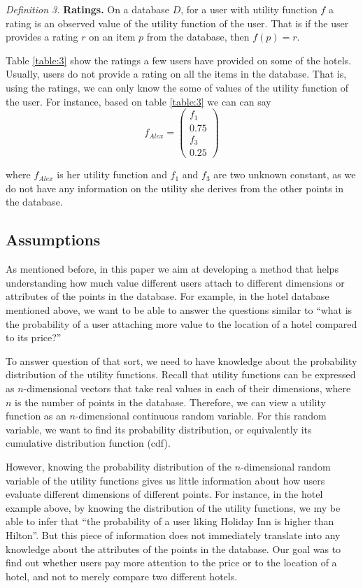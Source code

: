\medskip
\indent \textit{Definition 3.}  \textbf{Ratings.} On a database $D$, for a user with utility function $f$ a rating is an observed value of the utility function of the user. That is if the user provides a rating $r$ on an item $p$ from the database, then $f(p) = r$.
\medskip

Table \ref{table:3} show the ratings a few users have provided on some of the hotels. Usually, users do not provide a rating on all the items in the database. That is, using the ratings, we can only know the some of values of the utility function of the user. For instance, based on table \ref{table:3} we can can say
\[f_{Alex} = \left( \begin{array}{c}
f_1 \\
0.75 \\
f_3\\
0.25 \end{array} \right)\]

where $f_{Alex}$ is her utility function and $f_1$ and $f_3$ are two unknown constant, as we do not have any information on the utility she derives from the other points in the database. 

\subsection{Assumptions}
As mentioned before, in this paper we aim at developing a method that helps understanding how much value different users attach to different dimensions or attributes of the points in the database. For example, in the hotel database mentioned above, we want to be able to answer the questions similar to ``what is the probability of a user attaching more value to the location of a hotel compared to its price?'' 

To answer question of that sort, we need to have knowledge about the probability distribution of the utility functions. Recall that utility functions can be expressed as $n$-dimensional vectors that take real values in each of their dimensions, where $n$ is the number of points in the database. Therefore, we can view a utility function as an $n$-dimensional continuous random variable. For this random variable, we want to find its probability distribution, or equivalently its cumulative distribution function (cdf). 

However, knowing the probability distribution of the $n$-dimensional random variable of the utility functions gives us little information about how users evaluate different dimensions of different points. For instance, in the hotel example above, by knowing the distribution of the utility functions, we my be able to infer that ``the probability of a user liking Holiday Inn is higher than Hilton''. But this piece of information does not immediately translate into any knowledge about the attributes of the points in the database. Our goal was to find out whether users pay more attention to the price or to the location of a hotel, and not to merely compare two different hotels.

